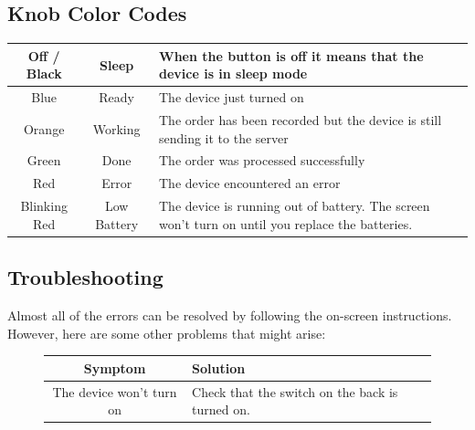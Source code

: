 \documentclass[12pt,a4paper,landscape]{article}
\begin{document}
\begin{multicols}{2}
		\subsection*{Knob Color Codes}
			\begin{tabular}{|c|c|p{4.3cm}|}
			\hline
				Off / Black & Sleep & When the button is off it means that the device is in sleep mode\\
				\hline
				Blue & Ready & The device just turned on\\
				\hline
				Orange & Working & The order has been recorded but the device is still sending it to the server\\
				\hline
				Green & Done & The order was processed successfully\\
				\hline
				Red & Error & The device encountered an error\\
				\hline
				Blinking Red & Low Battery & The device is running out of battery. The screen won't turn on until you replace the batteries.\\
				\hline
			\end{tabular}
		\subsection*{Troubleshooting}
		Almost all of the errors can be resolved by following the on-screen instructions. However, here are some other problems that might arise:
		\begin{figure}[H]
			\centering
			\begin{tabular}{|c|p{5cm}|}
				\hline
				Symptom & Solution\\
				\hline
				The device won't turn on & Check that the switch on the back is turned on.\\
				\hline
			\end{tabular}
		\end{figure}
	\end{multicols}

\vspace{2cm}
\end{document}
